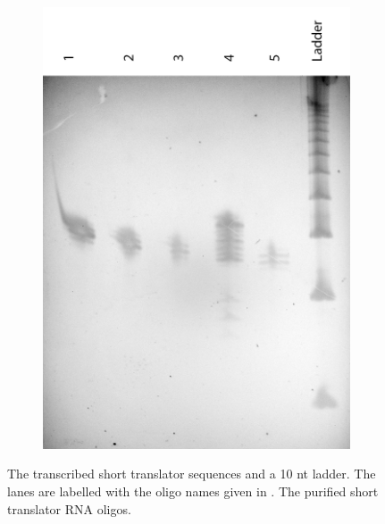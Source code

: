 \begin{figure}[h]
\begin{subfigure}[t]{.55\textwidth}
  \includegraphics[width=\textwidth]{images/translator_transcription_purified.png}
  \caption{}
  \label{translator_transcription_purified}
\end{subfigure}
\caption{ The transcribed short translator sequences and a 10 nt ladder. The lanes are labelled with the oligo names given in .  The purified short translator RNA oligos.}
\end{figure}

